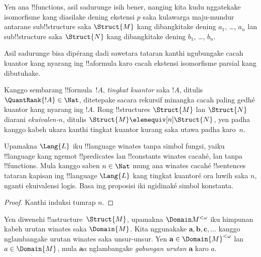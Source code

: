 \documentclass[../../../include/open-logic-section]{subfiles}
\begin{document}
\begin{rem}
Yen ana !!{function}s, asil sadurunge
isih bener, nanging kita kudu
nggatekake isomorfisme kang diasilake
dening ekstensi $p$ saka kulawarga maju-mundur antarane
sub!!{structure} saka $\Struct{M}$
kang dibangkitake dening $a_1$, \dots, $a_n$
lan sub!!{structure} saka
$\Struct{N}$ kang dibangkitake
dening $b_1$, \dots, $b_n$.
\end{rem}

Asil sadurunge bisa dipérang
dadi sawetara tataran kanthi
ngubungake cacah kuantor
kang nyarang ing !!a{formula}
karo cacah ekstensi
isomorfisme parsial kang dibutuhake.

\begin{defn}
  Kanggo sembarang !!{formula}~$!A$,
  \emph{tingkat kuantor} saka $!A$,
  ditulis $\QuantRank{!A} \in \Nat$,
  ditetepake sacara rekursif minangka
  cacah paling gedhé kuantor kang
  nyarang ing $!A$. Rong
  !!{structure}s $\Struct{M}$
  lan $\Struct{N}$ diarani
  \emph{ekuivalen-$n$}, ditulis
  $\Struct{M} \elemequiv[n] \Struct{N}$,
  yen padha kanggo kabeh ukara
  kanthi tingkat kuantor
  kurang saka utawa padha karo~$n$.
\end{defn}

\begin{prop}
  Upamakna $\Lang{L}$ iku
  !!{language} winates tanpa
  simbol fungsi, yaiku
  !!{language} kang ngemot
  !!{predicate}s lan !!{constant}s
  winates cacahé, lan tanpa
  !!{function}s. Mula kanggo
  saben $n \in \Nat$ mung ana
  winates cacahé !!{sentence}s
  tataran kapisan ing !!{language}
  $\Lang{L}$ kang tingkat
  kuantoré ora luwih saka $n$,
  nganti ekuivalensi logis.
  Basa ing proposisi iki ngidinaké simbol konstanta.
\end{prop}

\begin{proof}
  Kanthi induksi tumrap $n$.
\end{proof}

\begin{defn}
  Yen diwenehi !!a{structure}~$\Struct{M}$,
  upamakna $\Domain M^{<\omega}$
  iku himpunan kabeh urutan winates
  saka $\Domain{M}$. Kita nggunakake
  $\mathbf{a}, \mathbf{b},
  \mathbf{c}, \ldots$
  kanggo nglambangake urutan winates
  saka unsur-unsur. Yen
  $\mathbf{a} \in \Domain{M}^{<\omega}$
  lan $a \in \Domain{M}$,
  mula $\mathbf{a}a$ nglambangake
  \emph{gabungan urutan}
  $\mathbf{a}$ karo $a$.
\end{defn}
\end{document}
